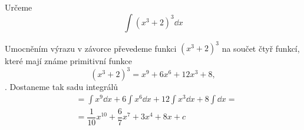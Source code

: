 \begin{mdframed}[style=mdexam]
  \begin{example}\label{MAI:exam148} 
    Určeme \[\int(x^3+2)^3\dd{x}\]
    
    Umocněním výrazu v závorce převedeme funkci \((x^3+2)^3\) na součet čtyř funkcí, které mají
    známe primitivní funkce \[(x^3+2)^3 = x^9+6x^6+12x^3+8,\]. Dostaneme tak sadu integrálů
    \begin{align*}
      &= \int x^9\dd{x} + 6\int x^6\dd{x} + 12\int x^3\dd{x} + 8\int\dd{x} =     \\
      &= \dfrac{1}{10}x^{10} + \dfrac{6}{7}x^{7} + 3x^4 + 8x + c  
    \end{align*}
  \end{example}
\end{mdframed}